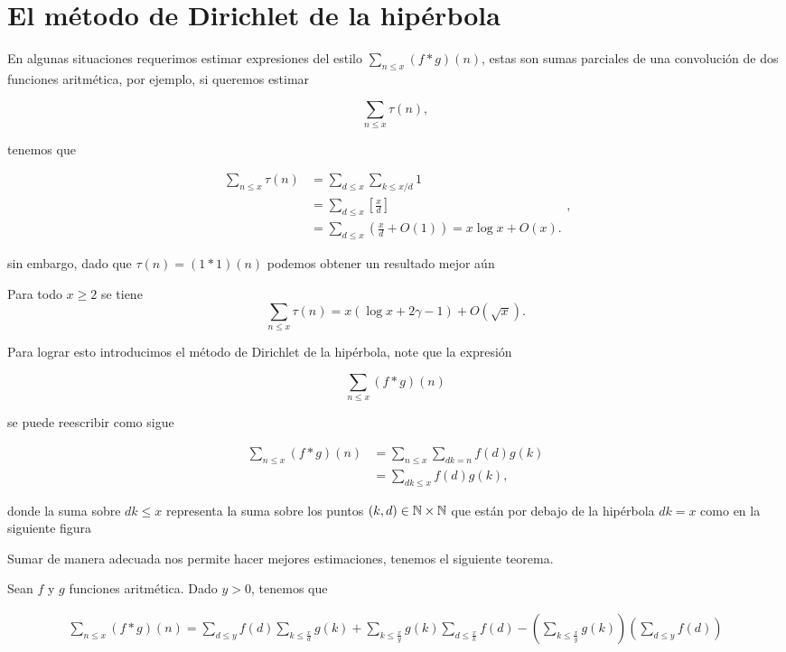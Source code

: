 \section{El método de Dirichlet de la hipérbola}

En algunas situaciones requerimos estimar expresiones del estilo $\displaystyle\sum_{n\leq x}(f*g)(n)$, estas son sumas parciales de una convolución de dos funciones aritmética, por ejemplo, si queremos estimar

$$\sum_{n\leq x} \tau(n),$$

tenemos que 

$$
\begin{aligned}
\sum_{n \leqslant x} \tau(n) & =\sum_{d \leqslant x} \sum_{k \leqslant x / d} 1 \\
& =\sum_{d \leqslant x}\left[\frac{x}{d}\right] \\
& =\sum_{d \leqslant x}\left(\frac{x}{d}+O(1)\right)=x \log x+O(x) .
\end{aligned},
$$

sin embargo, dado que $\tau(n)=(1*1)(n)$ podemos obtener un resultado mejor aún

\begin{theorem}[Dirichlet]
Para todo $x \geq 2$  se tiene \\
$$\sum_{n \leqslant x} \tau(n)=x(\log x+2 \gamma-1)+O(\sqrt{x}).$$
\end{theorem}

Para lograr esto introducimos el método de Dirichlet de la hipérbola, note que la expresión

$$\sum_{n\leq x}(f*g)(n)$$

se puede reescribir como sigue

\begin{align*}
    \sum_{n\leq x}(f*g)(n)&=\sum_{n\leq x}\sum_{dk= n}f(d)g\left(k\right)\\
    &=\sum_{dk\leq x} f(d)g(k)
,\end{align*}

donde la suma sobre $dk\leq x$ representa la suma sobre los puntos $(k,d)\in \mathbb{N}\times\mathbb{N}$ que están por debajo de la hipérbola $dk=x$ como en la siguiente figura


\begin{center}

\end{center}

Sumar de manera adecuada nos permite hacer mejores estimaciones, tenemos el siguiente teorema.


\begin{theorem}
 Sean $f$ y $g$ funciones aritmética. Dado $y>0$, tenemos que

$$
\begin{aligned}
\sum_{n \leq x}(f * g)(n)= \sum_{d \leq y} f(d) \sum_{k \leq \frac{x}{d}} g(k)+\sum_{k \leq \frac{x}{y}} g(k) \sum_{d \leq \frac{x}{k}} f(d)-\left(\sum_{k \leq \frac{x}{y}} g(k)\right)\left(\sum_{d \leq y} f(d)\right)
\end{aligned}
$$
\end{theorem}

